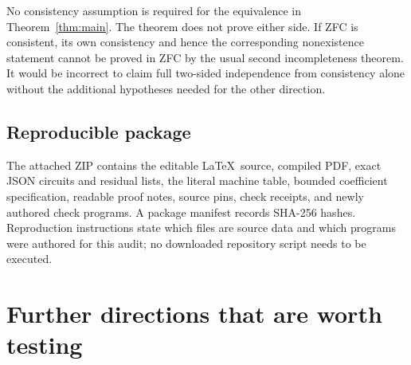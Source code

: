 \documentclass[11pt]{article}
\begin{document}
No consistency assumption is required for the equivalence in Theorem~\ref{thm:main}. The theorem does not prove either side. If ZFC is consistent, its own consistency and hence the corresponding nonexistence statement cannot be proved in ZFC by the usual second incompleteness theorem. It would be incorrect to claim full two-sided independence from consistency alone without the additional hypotheses needed for the other direction.

\subsection{Reproducible package}

The attached ZIP contains the editable \LaTeX\ source, compiled PDF, exact JSON circuits and residual lists, the literal machine table, bounded coefficient specification, readable proof notes, source pins, check receipts, and newly authored check programs. A package manifest records SHA-256 hashes. Reproduction instructions state which files are source data and which programs were authored for this audit; no downloaded repository script needs to be executed.



\section{Further directions that are worth testing}\label{sec:future}
\end{document}
